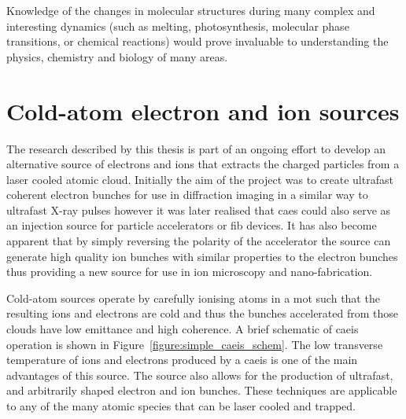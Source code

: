 Knowledge of the changes in molecular structures during many complex and interesting dynamics (such as melting, photosynthesis, molecular phase transitions, or chemical reactions) would prove invaluable to understanding the physics, chemistry and biology of many areas.

\section{Cold-atom electron and ion sources}

The research described by this thesis is part of an ongoing effort to develop an alternative source of electrons and ions that extracts the charged particles from a laser cooled atomic cloud.
Initially the aim of the project was to create ultrafast coherent electron bunches for use in diffraction imaging in a similar way to ultrafast X-ray pulses however it was later realised that \gls{caes} could also serve as an injection source for particle accelerators or \gls{fib} devices.
It has also become apparent that by simply reversing the polarity of the accelerator the source can generate high quality ion bunches with similar properties to the electron bunches thus providing a new source for use in ion microscopy and nano-fabrication.

Cold-atom sources operate by carefully ionising atoms in a \gls{mot} such that the resulting ions and electrons are cold and thus the bunches accelerated from those clouds have low emittance and high coherence.
A brief schematic of \gls{caeis} operation is shown in Figure~\ref{figure:simple_caeis_schem}.
The low transverse temperature of ions and electrons produced by a \gls{caeis} is one of the main advantages of this source.
The source also allows for the production of ultrafast, and arbitrarily shaped electron and ion bunches.
These techniques are applicable to any of the many atomic species that can be laser cooled and trapped.

